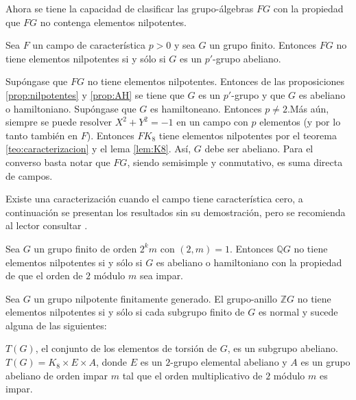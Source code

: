 Ahora se tiene la capacidad de clasificar las grupo-álgebras $FG$ con la propiedad que $FG$ no contenga elementos nilpotentes.
\begin{teorema}\label{teo:caracCarEntera}
Sea $F$ un campo de característica $p > 0$ y sea $G$ un grupo finito. Entonces $FG$ no tiene elementos nilpotentes si y sólo si $G$ es un $p'$-grupo abeliano. 
\end{teorema}
\begin{proof*}
Supóngase que $FG$ no tiene elementos nilpotentes. Entonces de las proposiciones \ref{prop:nilpotentes} y \ref{prop:AH} se tiene que $G$ es un $p'$-grupo y que $G$ es abeliano o hamiltoniano. Supóngase que $G$ es hamiltoneano. Entonces $p \neq 2$.Más aún, siempre se puede resolver $X^2 + Y^2 = -1$ en un campo con $p$ elementos (y por lo tanto también en $F$). Entonces $FK_8$ tiene elementos nilpotentes por el teorema \ref{teo:caracterizacion} y el lema \ref{lem:K8}. Así, $G$ debe ser abeliano.
Para el converso basta notar que $FG$, siendo semisimple y conmutativo, es suma directa de campos. 
\end{proof*}

Existe una caracterización cuando el campo tiene característica cero, a continuación se presentan los resultados sin su demostración, pero se recomienda al lector consultar \cite{bib:Sehgal}.
\begin{teorema}\label{teo:caracCar0}
Sea $G$ un grupo finito de orden $2^km$ con $(2,m) = 1$. Entonces $\mathds{Q}G$ no tiene elementos nilpotentes si y sólo si $G$ es abeliano o hamiltoniano con la propiedad de que el orden de $2$ módulo $m$ sea impar. 
\end{teorema}

\begin{teorema}
Sea $G$ un grupo nilpotente finitamente generado. El grupo-anillo $\mathds{Z}G$ no tiene elementos nilpotentes si y sólo si cada subgrupo finito de $G$ es normal y sucede alguna de las siguientes:
\begin{bulletList}
\newItem $T(G)$, el conjunto de los elementos de torsión de $G$, es un subgrupo abeliano.
\newItem $T(G) = K_8 \times E \times A$, donde $E$ es un $2$-grupo elemental abeliano y $A$ es un grupo abeliano de orden impar $m$ tal que el orden multiplicativo de $2$ módulo $m$ es impar.  
\end{bulletList}
\end{teorema}